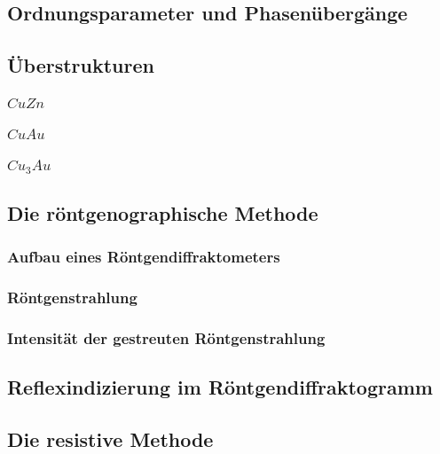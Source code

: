     \subsection{Ordnungsparameter und Phasenübergänge}
            

    \subsection{Überstrukturen}
        
        \subsubsection{$CuZn$}

        \subsubsection{$CuAu$}

        \subsubsection{$Cu_3Au$}

    \subsection{Die röntgenographische Methode}

        \subsubsection{Aufbau eines Röntgendiffraktometers}   

        \subsubsection{Röntgenstrahlung}

        \subsubsection{Intensität der gestreuten Röntgenstrahlung}

        \subsection{Reflexindizierung im Röntgendiffraktogramm}
    
    \subsection{Die resistive Methode}
        
